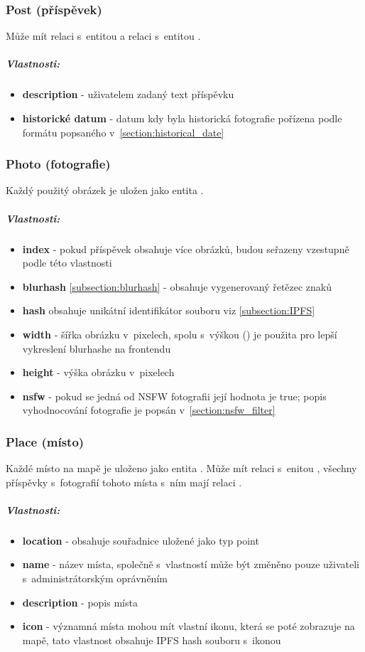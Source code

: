 \documentclass[12pt, a4paper,
  oneside,      %
]{report}
\newenvironment{propertiesItemize}{
\begin{itemize}{ 
  }}
  {\end{itemize}}
\begin{document}
\subsubsection{Post (příspěvek)}  Může mít relaci  s~entitou  a relaci  s~entitou .
\subparagraph{Vlastnosti:}
\begin{propertiesItemize}
	\item \textbf{description} - uživatelem zadaný text příspěvku
	\item \textbf{historické datum} - datum kdy byla historická fotografie pořízena podle formátu popsaného v~\ref{section:historical_date}
\end{propertiesItemize}
\subsubsection{Photo (fotografie)} Každý použitý obrázek je uložen jako entita .
\subparagraph{Vlastnosti:}
\begin{propertiesItemize}
	\item \textbf{index} - pokud příspěvek obsahuje více obrázků, budou seřazeny vzestupně podle této vlastnosti
	\item \textbf{blurhash} \ref{subsection:blurhash} - obsahuje vygenerovaný řetězec znaků
	\item \textbf{hash} obsahuje unikátní identifikátor souboru viz \ref{subsection:IPFS}
	\item \textbf{width} - šířka obrázku v~pixelech, spolu s~výškou () je použita pro lepší vykreslení blurhashe na frontendu
	\item \textbf{height} - výška obrázku v~pixelech
	\item \textbf{nsfw} - pokud se jedná od NSFW fotografii její hodnota je true; popis vyhodnocování fotografie je popsán v~\ref{section:nsfw_filter}
\end{propertiesItemize}
\subsubsection{Place (místo)} Každé místo na mapě je uloženo jako entita . Může mít relaci  s~enitou , všechny příspěvky s~fotografií tohoto místa s~ním mají relaci .
\subparagraph{Vlastnosti:}
\begin{propertiesItemize}
	\item \textbf{location} - obsahuje souřadnice uložené jako typ point \cite{Neo4jSparialFunctions}
	\item \textbf{name} - název místa, společně s~vlastností  může být změněno pouze uživateli s~administrátorským oprávněním
	\item \textbf{description} - popis místa
	\item \textbf{icon} - významná místa mohou mít vlastní ikonu, která se poté zobrazuje na mapě, tato vlastnost obsahuje IPFS hash souboru s~ikonou
\end{propertiesItemize}
\end{document}
